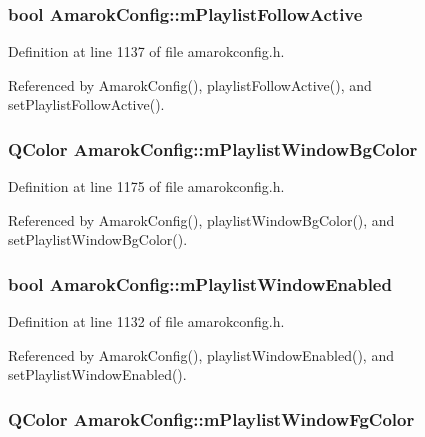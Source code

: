 \subsubsection{\setlength{\rightskip}{0pt plus 5cm}bool {\bf Amarok\-Config::m\-Playlist\-Follow\-Active}\hspace{0.3cm}{\tt  [protected]}}\label{classAmarokConfig_AmarokConfigp23}




Definition at line 1137 of file amarokconfig.h.

Referenced by Amarok\-Config(), playlist\-Follow\-Active(), and set\-Playlist\-Follow\-Active().
\subsubsection{\setlength{\rightskip}{0pt plus 5cm}QColor {\bf Amarok\-Config::m\-Playlist\-Window\-Bg\-Color}\hspace{0.3cm}{\tt  [protected]}}\label{classAmarokConfig_AmarokConfigp53}




Definition at line 1175 of file amarokconfig.h.

Referenced by Amarok\-Config(), playlist\-Window\-Bg\-Color(), and set\-Playlist\-Window\-Bg\-Color().
\subsubsection{\setlength{\rightskip}{0pt plus 5cm}bool {\bf Amarok\-Config::m\-Playlist\-Window\-Enabled}\hspace{0.3cm}{\tt  [protected]}}\label{classAmarokConfig_AmarokConfigp18}




Definition at line 1132 of file amarokconfig.h.

Referenced by Amarok\-Config(), playlist\-Window\-Enabled(), and set\-Playlist\-Window\-Enabled().
\subsubsection{\setlength{\rightskip}{0pt plus 5cm}QColor {\bf Amarok\-Config::m\-Playlist\-Window\-Fg\-Color}\hspace{0.3cm}{\tt  [protected]}}\label{classAmarokConfig_AmarokConfigp52}




